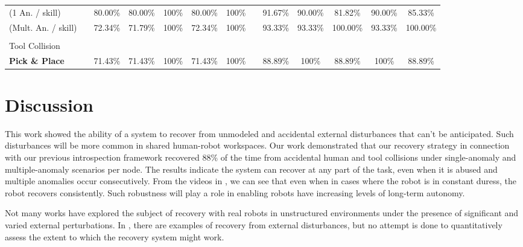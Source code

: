 \documentclass[letterpaper, 10 pt, conference]{ieeeconf}  %
\newcommand{\red}{\textcolor[rgb]{ .773,  0,  .043}}
\begin{document}
\begin{table*}[b]
\begin{tabular}{lccccccc|ccccc}
(1 An. / skill)					&        						& 80.00\% & 80.00\%    & 100\%        & 80.00\%    & 100\% 					&                     	& \red{91.67\%}         & 90.00\%    				& 81.82\%      & 90.00\%    & 85.33\%      	\\
(Mult. An. / skill) 			&         						& 72.34\% & 71.79\%    & 100\%        & 72.34\%    & 100\% 					&                     	& \red{93.33\%}         & 93.33\%    				& 100.00\%     & 93.33\%    & 100.00\%    	\\\\
Tool Collision 					&                      			&         &            &              &            &              			&   					&                      	&            				&              &           	&              	\\
\midrule
\textbf{Pick \& Place}  		&                      			& 71.43\% & 71.43\%    & 100\%      & 71.43\%     & 100\% 					&             			& \red{88.89\%}        	& 100\%        				& 88.89\%     	& 100\%    	& 88.89\%  
\end{tabular}
\end{table*}
\section{Discussion} \label{sec:discussion}
This work showed the ability of a system to recover from unmodeled and accidental external disturbances that can't be anticipated. Such disturbances will be more common in shared human-robot workspaces. Our work demonstrated that our recovery strategy in connection with our previous introspection framework recovered 88\% of the time from accidental human and tool collisions under single-anomaly and multiple-anomaly scenarios per node. The results indicate the system can recover at any part of the task, even when it is abused and multiple anomalies occur consecutively. From the videos in \cite{2017Humanoids-Rojas-supplementalURL}, we can see that even when in cases where the robot is in constant duress, the robot recovers consistently. Such robustness will play a role in enabling robots have increasing levels of long-term autonomy.

Not many works have explored the subject of recovery with real robots in unstructured environments under the presence of significant and varied external perturbations. In \cite{2015RSS-Kappler-DateDrivenOnlineDecisionMakingManipu,2012Humanoids-Pastor-TowardsASMs}, there are examples of recovery from external disturbances, but no attempt is done to quantitatively assess the extent to which the recovery system might work. 
\end{document}
